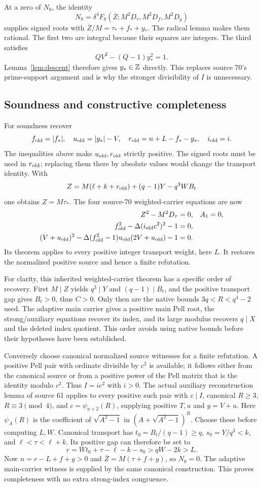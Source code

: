 At a zero of $N_8$, the identity
\[
 N_8=\delta^4 F_8(\overline Z;M^2D_\tau,M^2D_f,M^2D_y)
\]
supplies signed roots with
$\overline Z/M=\tau_*+f_*+y_*$. The radical lemma makes them rational.
The first two are integral because their squares are integers. The third
satisfies
\[
 QV^2-(Q-1)y_*^2=1.
\]
Lemma~\ref{lem:descent} therefore gives $y_*\in\mathbb Z$ directly.
This replaces source 70's prime-support argument and is why the stronger
divisibility of $I$ is unnecessary.

\subsection{Soundness and constructive completeness}

For soundness recover
\[
 f_{\rm old}=|f_*|,\quad u_{\rm old}=|y_*|-V,
 \quad r_{\rm old}=n+L-f_*-y_*,\quad i_{\rm old}=i.
\]
The inequalities above make $u_{\rm old},r_{\rm old}$ strictly positive.
The signed roots must be used in $r_{\rm old}$; replacing them there by
absolute values would change the transport identity. With
\[
 Z=M(\ell+k+r_{\rm old})+(q-1)Y-q^3WB_t
\]
one obtains $Z=M\tau_*$. The four source-70 weighted-carrier equations
are now
\begin{align*}
 Z^2-M^2D_\tau&=0,&A_1&=0,\\
 f_{\rm old}^2-\Delta(i_{\rm old}c^2)^2-1&=0,\\
 (V+u_{\rm old})^2-\Delta(f_{\rm old}^2-1)
            u_{\rm old}(2V+u_{\rm old})-1&=0.
\end{align*}
Its theorem applies to every positive integer transport weight, here
$L$. It restores the normalized positive source and hence a finite
refutation.

For clarity, this inherited weighted-carrier theorem has a specific
order of recovery. First $M\mid Z$ yields $q^3\mid Y$ and
$(q-1)\mid B_t$, and the positive transport gap gives $B_t>0$, thus
$C>0$. Only then are the native bounds $3q<R<q^4-2$ used. The adaptive
main carrier gives a positive main Pell root, the strong/auxiliary
equations recover its index, and its large modulus recovers $q\mid X$
and the deleted index quotient. This order avoids using native bounds
before their hypotheses have been established.

Conversely choose canonical normalized source witnesses for a finite
refutation. A positive Pell pair with ordinate divisible by $c^2$ is
available; it follows either from the canonical source or from a positive
power of the Pell matrix that is the identity modulo $c^2$. Thus
$I=ic^2$ with $i>0$. The actual auxiliary reconstruction lemma of source
61 applies to every positive such pair with $c\mid I$, canonical
$R\ge3$, $R\equiv3\pmod4$, and $c=\psi_{a+2}(R)$, supplying
positive $T,u$ and $y=V+u$. Here $\psi_A(R)$ is the coefficient of
$\sqrt{A^2-1}$ in $(A+\sqrt{A^2-1})^R$.
Choose these before computing $L,W$. Canonical transport has
$t_0=B_t/(q-1)\ge q$, $s_0=Y/q^3<k$, and $\ell<\tau<\ell+k$.
Its positive gap can therefore be set to
\[
 r=Wt_0+\tau-\ell-k-s_0>qW-2k>L.
\]
Now $n=r-L+f+y>0$ and $\overline Z=M(\tau+f+y)$, so $N_8=0$.
The adaptive main-carrier witness is supplied by the same canonical
construction. This proves completeness with no extra strong-index
congruence.


